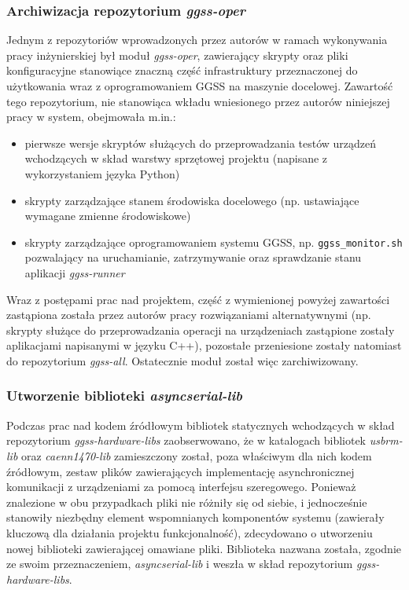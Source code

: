 \subsubsection{Archiwizacja repozytorium \emph{ggss-oper}}
Jednym z repozytoriów wprowadzonych przez autorów w ramach wykonywania pracy inżynierskiej był moduł \emph{ggss-oper}, zawierający skrypty oraz pliki konfiguracyjne stanowiące znaczną część infrastruktury przeznaczonej do użytkowania wraz z oprogramowaniem GGSS na maszynie docelowej. Zawartość tego repozytorium, nie stanowiąca wkładu wniesionego przez autorów niniejszej pracy w system, obejmowała m.in.: 
\begin{itemize}
    \item pierwsze wersje skryptów służących do przeprowadzania testów urządzeń wchodzących w skład warstwy sprzętowej projektu (napisane z wykorzystaniem języka Python)
    \item skrypty zarządzające stanem środowiska docelowego (np. ustawiające wymagane zmienne środowiskowe)
    \item skrypty zarządzające oprogramowaniem systemu GGSS, np. \lstinline{ggss_monitor.sh} pozwalający na uruchamianie, zatrzymywanie oraz sprawdzanie stanu aplikacji \emph{ggss-runner}
\end{itemize}
Wraz z postępami prac nad projektem, część z wymienionej powyżej zawartości zastąpiona została przez autorów pracy rozwiązaniami alternatywnymi (np. skrypty służące do przeprowadzania operacji na urządzeniach zastąpione zostały aplikacjami napisanymi w języku C++), pozostałe przeniesione zostały natomiast do repozytorium \emph{ggss-all}. Ostatecznie moduł został więc zarchiwizowany.


\subsubsection{Utworzenie biblioteki \emph{asyncserial-lib}}
Podczas prac nad kodem źródłowym bibliotek statycznych wchodzących w skład repozytorium \emph{ggss-hardware-libs} zaobserwowano, że w katalogach bibliotek \emph{usbrm-lib} oraz \emph{caenn1470-lib} zamieszczony został, poza właściwym dla nich kodem źródłowym, zestaw plików zawierających implementację asynchronicznej komunikacji z urządzeniami za pomocą interfejsu szeregowego. Ponieważ znalezione w obu przypadkach pliki nie różniły się od siebie, i jednocześnie stanowiły niezbędny element wspomnianych komponentów systemu (zawierały kluczową dla działania projektu funkcjonalność), zdecydowano o utworzeniu nowej biblioteki zawierającej omawiane pliki. Biblioteka nazwana została, zgodnie ze swoim przeznaczeniem, \emph{asyncserial-lib} i weszła w skład repozytorium \emph{ggss-hardware-libs}.


